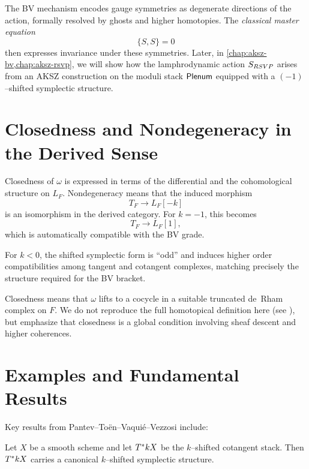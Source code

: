 The BV mechanism encodes gauge symmetries as degenerate directions of the
action, formally resolved by ghosts and higher homotopies. The \emph{classical
master equation}
\[
  \{S,S\} = 0
\]
then expresses invariance under these symmetries. Later, in
\cref{chap:aksz-bv,chap:aksz-rsvp}, we will show how the lamphrodynamic action
$S_{RSVP}$ arises from an AKSZ construction on the moduli stack
$\mathsf{Plenum}$ equipped with a $(-1)$--shifted symplectic structure.

\section{Closedness and Nondegeneracy in the Derived Sense}

Closedness of $\omega$ is expressed in terms of the differential and the
cohomological structure on $L_F$. Nondegeneracy means that the induced morphism
\[
  T_F \longrightarrow L_F[-k]
\]
is an isomorphism in the derived category. For $k=-1$, this becomes
\[
  T_F \longrightarrow L_F[1],
\]
which is automatically compatible with the BV grade.

\begin{remark}
For $k<0$, the shifted symplectic form is ``odd'' and induces higher order
compatibilities among tangent and cotangent complexes, matching precisely the
structure required for the BV bracket.
\end{remark}

Closedness means that $\omega$ lifts to a cocycle in a suitable truncated
de~Rham complex on $F$. We do not reproduce the full homotopical definition here
(see \cite{PTVV2013}), but emphasize that closedness is a global condition
involving sheaf descent and higher coherences.

\section{Examples and Fundamental Results}

Key results from Pantev–Toën–Vaquié–Vezzosi \cite{PTVV2013} include:

\begin{theorem}[PTVV]
Let $X$ be a smooth scheme and let $T^{\ast}kX$ be the $k$--shifted cotangent
stack. Then $T^{\ast}kX$ carries a canonical $k$--shifted symplectic structure.
\end{theorem}

